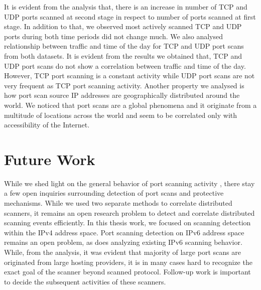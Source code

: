 It is evident from the analysis that, there is an increase in number of TCP and UDP ports scanned at second stage in respect to number of ports scanned at first stage.
In addition to that, we observed most actively scanned TCP and UDP ports during both time periods did not change much.
We also analysed relationship between traffic and time of the day
for TCP and UDP port scans from both datasets.
It is evident from the results we obtained that, TCP and UDP port scans do not show a correlation between traffic and time of the day.
However, TCP port scanning is a constant activity while UDP port scans are not very frequent as TCP port scanning activity.
Another property we analysed is how port scan source IP addresses are geographically distributed around the world.
We noticed that port scans are a global phenomena and it originate from a multitude of locations across the world and seem to be correlated only with accessibility of the Internet.
\section{Future Work}
While we shed light on the general behavior of port scanning activity , there stay a few open inquiries surrounding detection of port scans and protective mechanisms.
While we used two separate methods to correlate distributed scanners, it remains an open
research problem to detect and correlate distributed scanning events efficiently.
In this thesis work, we focused on scanning detection within the IPv4 address space.
Port scanning detection on IPv6 address space remains an open problem, as does analyzing existing IPv6 scanning behavior.
While, from the analysis, it was evident that majority of large port scans are originated from large hosting providers, it is in many cases hard to recognize the exact goal of the scanner beyond scanned protocol.
Follow-up work is important to decide the subsequent activities of these scanners.
